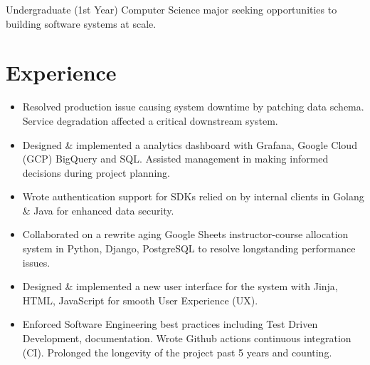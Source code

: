 %
%


\fancyhead{} %


Undergraduate (1st Year) Computer Science major seeking opportunities to building software systems at scale.

\section{Experience}
\begin{itemize}
    \item Resolved production issue causing system downtime by patching data schema. Service degradation affected a critical downstream system.
    \item 
        Designed \& implemented a analytics dashboard with Grafana, Google Cloud (GCP) BigQuery and SQL. Assisted management in making informed decisions during project planning.
    \item Wrote authentication support for SDKs relied on by internal clients in Golang \& Java for enhanced data security.
\end{itemize}

\begin{itemize}
  \item Collaborated on a rewrite aging Google Sheets instructor-course allocation system in Python, Django, PostgreSQL to 
    resolve longstanding performance issues. 
  \item Designed \& implemented a new user interface 
    for the system with Jinja, HTML, JavaScript for smooth User Experience (UX).
  \item Enforced Software Engineering best practices including Test Driven Development,
    documentation. Wrote Github actions continuous integration (CI). 
    Prolonged the longevity of the project past 5 years and counting.
\end{itemize}

